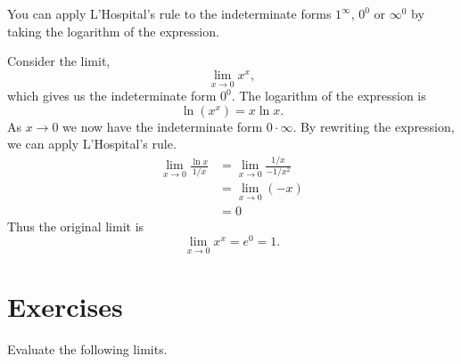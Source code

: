 You can apply L'Hospital's rule to the indeterminate forms $1^\infty$, 
$0^0$ or $\infty^0$ by taking the logarithm of the expression.


\begin{example}
{\rm
  Consider the limit,
  \[
  \lim_{x \to 0} x^x,
  \]
  which gives us the indeterminate form $0^0$.
  The logarithm of the expression is
  \[
  \ln( x^x ) = x \ln x.
  \]
  As $x \to 0$ we now have the indeterminate form $0 \cdot \infty$.  By 
  rewriting the expression, we can apply L'Hospital's rule.
  \begin{align*}
    \lim_{x \to 0} \frac{\ln x}{1/x}
    &= \lim_{x \to 0} \frac{1/x}{-1/x^2} \\
    &= \lim_{x \to 0} (-x) \\
    &= 0
  \end{align*}
  Thus the original limit is
  \[
  \lim_{x \to 0} x^x = e^0 = 1.
  \]
}
\end{example}

\section{Exercises}
Evaluate the following limits.

